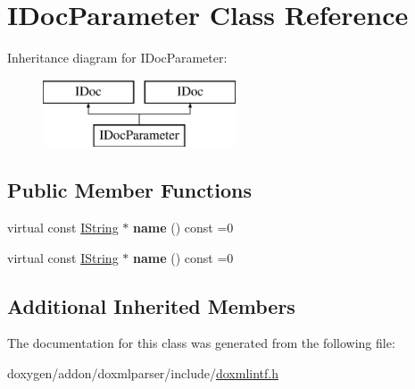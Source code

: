 \hypertarget{class_i_doc_parameter}{}\section{I\+Doc\+Parameter Class Reference}
\label{class_i_doc_parameter}
Inheritance diagram for I\+Doc\+Parameter\+:\begin{figure}[H]
\begin{center}
\leavevmode
\includegraphics[height=2.000000cm]{class_i_doc_parameter}
\end{center}
\end{figure}
\subsection*{Public Member Functions}
\begin{DoxyCompactItemize}
\item 
\mbox{\label{class_i_doc_parameter_a68d34563e3f92c38c0b5106d577735aa}} 
virtual const \mbox{\hyperlink{class_i_string}{I\+String}} $\ast$ {\bfseries name} () const =0
\item 
\mbox{\label{class_i_doc_parameter_a68d34563e3f92c38c0b5106d577735aa}} 
virtual const \mbox{\hyperlink{class_i_string}{I\+String}} $\ast$ {\bfseries name} () const =0
\end{DoxyCompactItemize}
\subsection*{Additional Inherited Members}


The documentation for this class was generated from the following file\+:\begin{DoxyCompactItemize}
\item 
doxygen/addon/doxmlparser/include/\mbox{\hyperlink{include_2doxmlintf_8h}{doxmlintf.\+h}}\end{DoxyCompactItemize}
